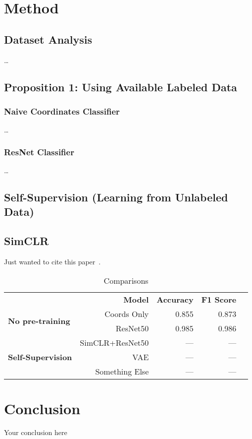 \documentclass{article}
\begin{document}
\section{Method}\label{sec:method}

\subsection{Dataset Analysis}
\dots

\subsection{Proposition 1: Using Available Labeled Data}
\subsubsection{Naive Coordinates Classifier}
\dots

\subsubsection{ResNet Classifier}
\dots

\subsection{Self-Supervision (Learning from Unlabeled Data)}

\subsection{SimCLR}
Just wanted to cite this paper~\cite{simclr}.

\begin{table}[!htp]\centering
  \caption{Comparisons}\label{tab: }
  \scriptsize
  \begin{tabular}{lrrrr}\toprule
                                               & \textbf{Model}  & \textbf{Accuracy} & \textbf{F1 Score} \\\cmidrule{2-4}
    \multirow{2}{*}{\textbf{No pre-training}}  & Coords Only     & 0.855             & 0.873             \\ %
                                               & ResNet50        & 0.985             & 0.986             \\\cmidrule{1-4}
    \multirow{3}{*}{\textbf{Self-Supervision}} & SimCLR+ResNet50 & ---               & ---               \\ %
                                               & VAE             & ---               & ---               \\ %
                                               & Something Else  & ---               & ---               \\\midrule
    \bottomrule
  \end{tabular}
\end{table}

\section{Conclusion}
Your conclusion here



\end{document}
